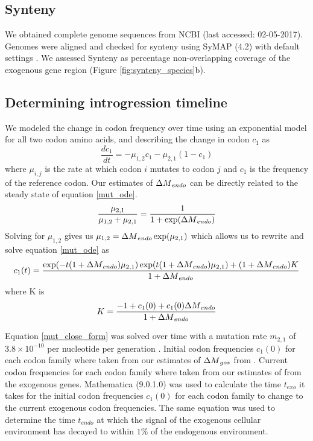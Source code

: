 \subsection{Synteny}
We obtained complete genome sequences from NCBI (last accessed: 02-05-2017).
Genomes were aligned and checked for synteny using SyMAP (4.2) with default settings \citep{soderlund2006, soderlund2011}.
We assessed Synteny as percentage non-overlapping coverage of the exogenous gene region (Figure \ref{fig:synteny_species}b).

\subsection{Determining introgression timeline}
We modeled the change in codon frequency over time using an exponential model for all two codon amino acids, and describing the change in codon $c_1$ as
\begin{equation}
\frac{d c_1}{d t} = -\mu_{1,2}c_1 - \mu_{2,1}(1-c_1)
\label{mut_ode}
\end{equation}
where $\mu_{i,j}$ is the rate at which codon $i$ mutates to codon $j$ and $c_1$ is the frequency of the reference codon.
Our estimates of ${\Delta M}_{endo}$ can be directly related to the steady state of equation \ref{mut_ode}.
\begin{equation}
\frac{\mu_{2,1}}{\mu_{1,2} + \mu_{2,1}} = \frac{1}{1+\exp({\Delta M}_{endo})}
\end{equation}
Solving for $\mu_{1,2}$ gives us $\mu_{1,2} = {\Delta M}_{endo}\exp(\mu_{2,1})$ which allows us to rewrite and solve equation \ref{mut_ode} as
\begin{equation}
c_1(t) = \frac{\exp(-t(1+{\Delta M}_{endo})\mu_{2,1})\exp(t(1+{\Delta M}_{endo})\mu_{2,1}) + (1+{\Delta M}_{endo})K}{1+{\Delta M}_{endo}}
\label{mut_close_form}
\end{equation}
where K is
\begin{equation}
K = \frac{-1 + c_1(0) + c_1(0){\Delta M}_{endo}}{1+{\Delta M}_{endo}}
\end{equation}

Equation \ref{mut_close_form} was solved over time with a mutation rate $m_{2,1}$ of $3.8\times 10^{-10}$ per nucleotide per generation \citep{lang2008}. 
Initial codon frequencies $c_1(0)$ for each codon family where taken from our estimates of ${\Delta M}_{gos}$ from \gossypii. 
Current codon frequencies for each codon family where taken from our estimates of \DM from the exogenous genes.
Mathematica (9.0.1.0) \citep{Mathematica} was used to calculate the time $t_{exo}$ it takes for the initial codon frequencies $c_1(0)$ for each codon family to change to the current exogenous codon frequencies.
The same equation was used to determine the time $t_{endo}$ at which the signal of the exogenous cellular environment has decayed to within $1 \%$ of the endogenous environment.

